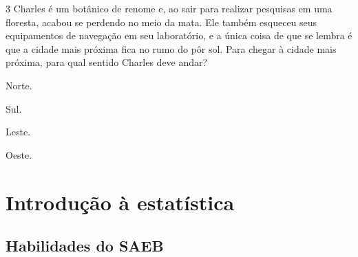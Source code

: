




\num{3} Charles é um botânico de renome e, ao sair para realizar pesquisas em
uma floresta, acabou se perdendo no meio da mata. Ele também esqueceu
seus equipamentos de navegação em seu laboratório, e a única coisa de
que se lembra é que a cidade mais próxima fica no rumo do pôr sol. Para
chegar à cidade mais próxima, para qual sentido Charles deve andar?

\begin{escolha}[itemsep=0pt]
\item Norte.
\item Sul.
\item Leste.
\item Oeste.
\end{escolha}







\chapter{Introdução à estatística}

\section*{Habilidades do SAEB}

